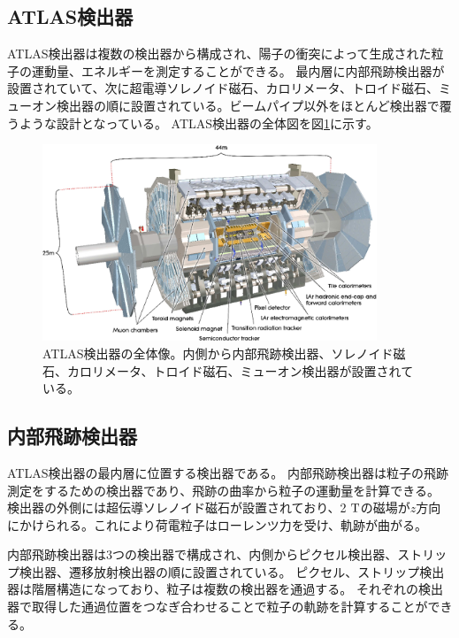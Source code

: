 \subsection{ATLAS検出器}
ATLAS検出器は複数の検出器から構成され、陽子の衝突によって生成された粒子の運動量、エネルギーを測定することができる。
最内層に内部飛跡検出器が設置されていて、次に超電導ソレノイド磁石、カロリメータ、トロイド磁石、ミューオン検出器の順に設置されている。ビームパイプ以外をほとんど検出器で覆うような設計となっている。
ATLAS検出器の全体図を図\ref{atlas_detector}に示す。

\begin{figure}[bpt]\centering
\includegraphics[width=10cm]{./atlas_detector.png}
\caption[ATLAS検出器の全体像]{ATLAS検出器の全体像\cite{1-2}。内側から内部飛跡検出器、ソレノイド磁石、カロリメータ、トロイド磁石、ミューオン検出器が設置されている。}
\label{atlas_detector}
\end{figure}


\subsection{内部飛跡検出器}
ATLAS検出器の最内層に位置する検出器である。
内部飛跡検出器は粒子の飛跡測定をするための検出器であり、飛跡の曲率から粒子の運動量を計算できる。
検出器の外側には超伝導ソレノイド磁石が設置されており、2 $\rm{T}$の磁場が$z$方向にかけられる。これにより荷電粒子はローレンツ力を受け、軌跡が曲がる。

内部飛跡検出器は3つの検出器で構成され、内側からピクセル検出器、ストリップ検出器、遷移放射検出器の順に設置されている。
ピクセル、ストリップ検出器は階層構造になっており、粒子は複数の検出器を通過する。
それぞれの検出器で取得した通過位置をつなぎ合わせることで粒子の軌跡を計算することができる。

